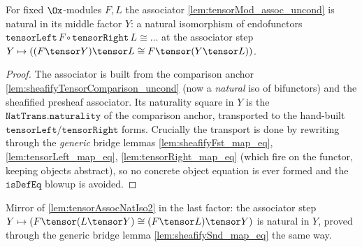 \begin{lemma}

  \label{lem:tensorAssocNatIso2}
  For fixed $\Ox$-modules $F, L$ the associator \cref{lem:tensorMod_assoc_uncond} is
  natural in its middle factor $Y$: a natural isomorphism of endofunctors
  $\texttt{tensorLeft}\,F \circ \texttt{tensorRight}\,L \cong \dots$ at the associator step
  $Y \mapsto ((F \tensor Y) \tensor L \cong F \tensor (Y \tensor L))$.
  \begin{proof}
    The associator is built from the comparison anchor
    \cref{lem:sheafifyTensorComparison_uncond} (now a \emph{natural} iso of bifunctors) and
    the sheafified presheaf associator. Its naturality square in $Y$ is the
    $\texttt{NatTrans.naturality}$ of the comparison anchor, transported to the hand-built
    $\texttt{tensorLeft}/\texttt{tensorRight}$ forms. Crucially the transport is done by
    rewriting through the \emph{generic} bridge lemmas \cref{lem:sheafifyFst_map_eq},
    \cref{lem:tensorLeft_map_eq}, \cref{lem:tensorRight_map_eq} (which fire on the functor,
    keeping objects abstract), so no concrete object equation is ever formed and the
    $\texttt{isDefEq}$ blowup is avoided.
  \end{proof}
\end{lemma}

\begin{lemma}

  \label{lem:tensorAssocNatIso3}
  Mirror of \cref{lem:tensorAssocNatIso2} in the last factor: the associator step
  $Y \mapsto (F \tensor (L \tensor Y) \cong (F \tensor L) \tensor Y)$ is natural in $Y$,
  proved through the generic bridge lemma \cref{lem:sheafifySnd_map_eq} the same way.
\end{lemma}

